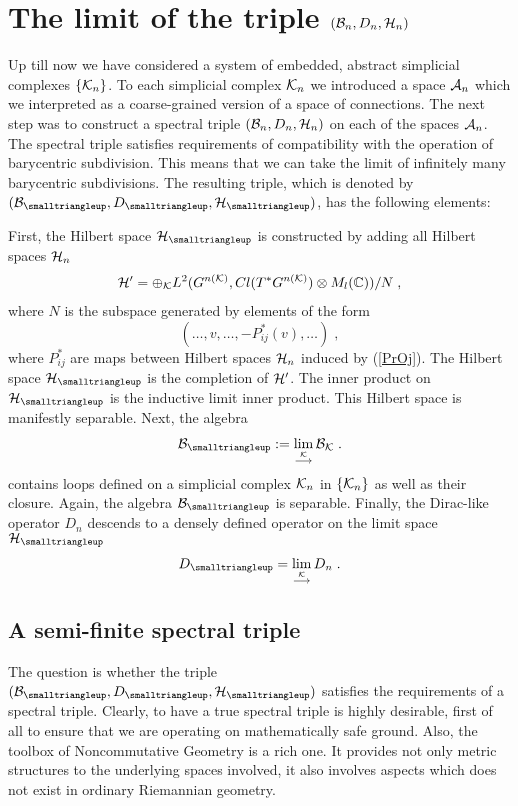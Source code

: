 \documentclass[12pt]{article}
\newcommand{\ba}{\begin{eqnarray}}
\newcommand{\ea}{\end{eqnarray}}
\def\ca{{\cal A}}
\def\cb{{\cal B}}
\def\ch{{\cal H}}
\def\ck{{\cal K}}
\begin{document}
\section{The limit of the triple $(\cb_n,D_n,\ch_n)$}
\label{projlim}


Up till now we have considered a system of embedded, abstract simplicial complexes $\{\ck_n\}$. To each simplicial complex $\ck_n$ we introduced a space $\ca_{n}$ which we interpreted as a coarse-grained version of a space of connections. 
The next step was to construct a spectral triple $(\cb_n,D_n,\ch_n)$ on each of the spaces $\ca_{n}$. 
The spectral triple satisfies requirements of compatibility with the operation of barycentric subdivision. This means that we can take the limit of infinitely many barycentric subdivisions. The resulting triple, which is denoted by $(\cb_{\smalltriangleup},D_{\smalltriangleup},\ch_\smalltriangleup)$, has the following elements:

 First, the Hilbert space $\ch_\smalltriangleup$ is constructed by adding all Hilbert spaces $\ch_{n}$
\ba
\ch'=\oplus_{\ck}L^2 (G^{n(\ck)},Cl(T^*G^{n(\ck)})\otimes M_l(\mathbb{C}))/N\;, 
\label{alg}
\ea 
where $N$ is the subspace generated by elements of the form 
\[
(\ldots , v, \ldots , -P^*_{ij}(v),\ldots )\;,
\label{N}
\] 
where $P^*_{ij}$ are maps between Hilbert spaces $\ch_n$ induced by (\ref{PrOj}). The Hilbert space $\ch_\smalltriangleup$ is the completion of $\ch'$. The inner product on $\ch_{\smalltriangleup}$ is the inductive limit inner product. This Hilbert space is manifestly separable. 
Next, the algebra
\ba
\cb_{\smalltriangleup}:= \lim_{\stackrel{\ck}{\longrightarrow}}\cb_{\ck}\;.
\label{cb-tri}
\ea
contains loops defined on a simplicial complex $\ck_n$ in $\{\ck_n\}$ as well as their closure. Again, the algebra $\cb_{\smalltriangleup}$ is separable.
Finally, the Dirac-like operator $D_n$ descends to a densely defined operator on the limit space $\ch_{\smalltriangleup}$
\ba
D_{\smalltriangleup} = \lim_{\stackrel{\ck}{\longrightarrow}}D_n\;.
\label{didi}
\ea










\subsection{A semi-finite spectral triple}
\label{sectiontrace}

The question is whether the triple $(\cb_{\smalltriangleup},D_{\smalltriangleup},\ch_\smalltriangleup)$ satisfies the requirements of a spectral triple. Clearly, to have a true spectral triple is highly desirable, first of all to ensure that we are operating on mathematically safe ground. Also, the toolbox of Noncommutative Geometry is a rich one. It provides not only metric structures to the underlying spaces involved, it also involves aspects which does not exist in ordinary Riemannian geometry.
\end{document}
